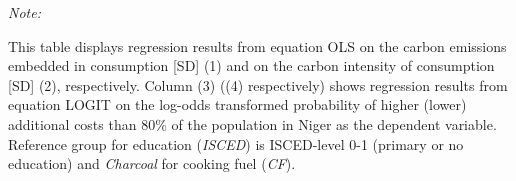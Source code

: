 \begin{table}[htbp!]
\begin{adjustbox}{width = 1\textwidth, max height = 0.95\textheight, center}
\begin{threeparttable}[b]
         \begin{tablenotes}\item \medskip \textit{Note:}
            \item This table displays regression results from equation OLS on the carbon emissions embedded in consumption [SD] (1) and on the carbon intensity of consumption [SD] (2), respectively. 
                                      Column (3) ((4) respectively) shows regression results from equation LOGIT on the log-odds transformed probability of higher (lower) additional costs than 80\% of the population in Niger as the dependent variable. Reference group for education (\textit{ISCED}) is ISCED-level 0-1 (primary or no education) and \textit{Charcoal} for cooking fuel (\textit{CF}).
         \end{tablenotes}
      \end{threeparttable}
   \end{adjustbox}
\end{table}


